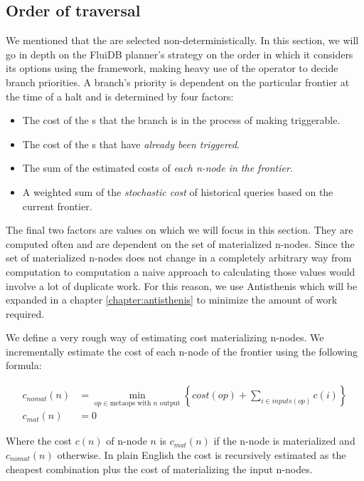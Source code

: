\subsection{Order of traversal}

We mentioned that the  are selected
non-deterministically. In this section, we will go in depth on the
FluiDB planner's strategy on the order in which it considers its
options using the  framework, making heavy use of the
 operator to decide branch priorities. A branch's priority
is dependent on the particular frontier at the time of a halt and is
determined by four factors:

\begin{itemize}
\item The cost of the s that the branch is in the process
  of making triggerable.
\item The cost of the s that have \emph{already been triggered}.
\item The sum of the estimated costs of \emph{each n-node in the frontier}.
\item A weighted sum of the \emph{stochastic cost} of historical queries based
on the current frontier.
\end{itemize}

The final two factors are values on which we will focus in this
section. They are computed often and are dependent on the set of
materialized n-nodes. Since the set of materialized n-nodes does not
change in a completely arbitrary way from computation to computation a
naive approach to calculating those values would involve a lot of
duplicate work. For this reason, we use Antisthenis which will be
expanded in a chapter \ref{chapter:antisthenis} to minimize the amount
of work required.

We define a very rough way
of estimating cost materializing n-nodes. We incrementally estimate the cost of each n-node
of the frontier using the following formula:

\begin{align*}
  c_{nomat}(n) &=
    \min\limits_{op \in \text{metaops with \(n\) output}} \left\{ cost(op) + \sum\limits_{i \in inputs(op)} c(i)  \right\} \\
  c_{mat}(n) &= 0
\end{align*}

Where the cost \(c(n)\) of n-node \(n\) is \(c_{mat}(n)\) if the n-node
is materialized and \(c_{nomat}(n)\) otherwise. In plain English the
cost is recursively estimated as the cheapest combination 
plus the cost of materializing the input n-nodes.

